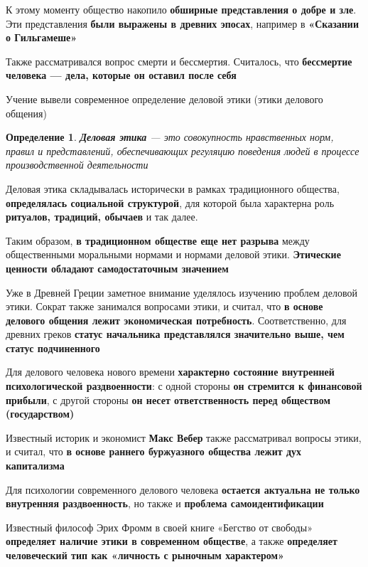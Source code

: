 \documentclass{article}
\newtheorem{definition}{Определение}
\begin{document}
К этому моменту общество накопило \textbf{обширные представления о добре и зле}. Эти представления \textbf{были выражены в древних эпосах}, например в \textbf{«Сказании о Гильгамеше»}

Также рассматривался вопрос смерти и бессмертия. Считалось, что \textbf{бессмертие человека — дела, которые он оставил после себя}

Учение вывели современное определение деловой этики (этики делового общения)

\begin{definition}
\textbf{Деловая этика} — это совокупность нравственных норм, правил и представлений, обеспечивающих регуляцию поведения людей в процессе производственной деятельности
\end{definition}

Деловая этика складывалась исторически в рамках традиционного общества, \textbf{определялась социальной структурой}, для которой была характерна роль \textbf{ритуалов, традиций, обычаев} и так далее.

Таким образом, \textbf{в традиционном обществе еще нет разрыва} между общественными моральными нормами и нормами деловой этики. \textbf{Этические ценности обладают самодостаточным значением}

Уже в Древней Греции заметное внимание уделялось изучению проблем деловой этики. Сократ также занимался вопросами этики, и считал, что \textbf{в основе делового общения лежит экономическая потребность}. Соответственно, для древних греков \textbf{статус начальника представлялся значительно выше, чем статус подчиненного}

\hfill

Для делового человека нового времени \textbf{характерно состояние внутренней психологической раздвоенности}: с одной стороны \textbf{он стремится к финансовой прибыли}, с другой стороны \textbf{он несет ответственность перед обществом (государством)}

Известный историк и экономист \textbf{Макс Вебер} также рассматривал вопросы этики, и считал, что \textbf{в основе раннего буржуазного общества лежит дух капитализма}

Для психологии современного делового человека \textbf{остается актуальна не только внутренняя раздвоенность}, но также и \textbf{проблема самоидентификации}

Известный философ Эрих Фромм в своей книге «Бегство от свободы» \textbf{определяет наличие этики в современном обществе}, а также \textbf{определяет человеческий тип как «личность с рыночным характером»}
\end{document}
